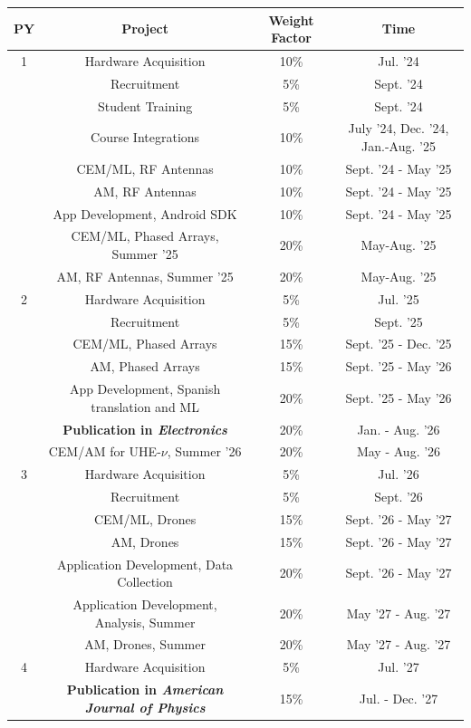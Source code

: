 \documentclass[11pt]{amsart}
\begin{document}
\begin{table}[ht]
\footnotesize
\centering
\begin{tabular}{c | c | c | c}
PY & Project & Weight Factor & Time \\ \hline
1 & Hardware Acquisition & 10\% & Jul. '24 \\
 & Recruitment & 5\% & Sept. '24 \\ 
 & Student Training & 5\% & Sept. '24 \\
 & Course Integrations & 10\% & July '24, Dec. '24, Jan.-Aug. '25 \\
 & CEM/ML, RF Antennas & 10\% & Sept. '24 - May '25 \\
 & AM, RF Antennas & 10\% & Sept. '24 - May '25 \\
 & App Development, Android SDK & 10\% & Sept. '24 - May '25 \\
 & CEM/ML, Phased Arrays, Summer '25 & 20\% & May-Aug. '25 \\
 & AM, RF Antennas, Summer '25 & 20\% & May-Aug. '25 \\
\hline
2 & Hardware Acquisition & 5\% & Jul. '25 \\ 
 & Recruitment & 5\% & Sept. '25 \\
 & CEM/ML, Phased Arrays & 15\% & Sept. '25 - Dec. '25 \\
 & AM, Phased Arrays & 15\% & Sept. '25 - May '26 \\
 & App Development, Spanish translation and ML & 20\% & Sept. '25 - May '26 \\
 & \textbf{Publication in \textit{Electronics}} & 20\% & Jan. - Aug. '26 \\
 & CEM/AM for UHE-$\nu$, Summer '26 & 20\% & May - Aug. '26 \\
\hline
3 & Hardware Acquisition & 5\% & Jul. '26 \\
 & Recruitment & 5\% & Sept. '26 \\
 & CEM/ML, Drones & 15\% & Sept. '26 - May '27 \\
 & AM, Drones & 15\% & Sept. '26 - May '27 \\
 & Application Development, Data Collection & 20\% & Sept. '26 - May '27 \\
 & Application Development, Analysis, Summer & 20\% & May '27 - Aug. '27 \\
 & AM, Drones, Summer & 20\% & May '27 - Aug. '27 \\
\hline
4 & Hardware Acquisition & 5\% & Jul. '27 \\
 & \textbf{Publication in \textit{American Journal of Physics}} & 15\% & Jul. - Dec. '27 \\

\end{tabular}
\end{table}
\end{document}
